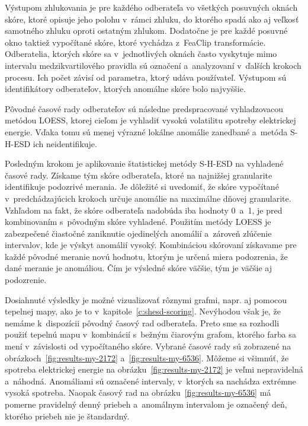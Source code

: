 \documentclass[a4paper,twoside,slovak,12pt,appendix]{article}
\begin{document}
Výstupom zhlukovania je pre každého odberateľa vo všetkých posuvných oknách
skóre, ktoré opisuje jeho polohu v~rámci zhluku, do ktorého spadá ako aj veľkosť
samotného zhluku oproti ostatným zhlukom. Dodatočne je pre každé posuvné okno
taktiež vypočítané skóre, ktoré vychádza z~FeaClip transformácie. Odberatelia,
ktorých skóre sa v~jednotlivých oknách často vyskytuje mimo intervalu
medzikvartilového pravidla sú označení a~analyzovaní v~ďalších krokoch procesu.
Ich počet závisí od parametra, ktorý udáva používateľ. Výstupom sú
identifikátory odberateľov, ktorých anomálne skóre bolo najvyššie.

Pôvodné časové rady odberateľov sú následne predspracované vyhladzovacou metódou
LOESS, ktorej cieľom je vyhladiť vysokú volatilitu spotreby elektrickej energie.
Vďaka tomu sú menej výrazné lokálne anomálie zanedbané a~metóda S-H-ESD ich
neidentifikuje.

Posledným krokom je aplikovanie štatistickej metódy S-H-ESD na vyhladené časové
rady. Získame tým skóre odberateľa, ktoré na najnižšej granularite identifikuje
podozrivé merania. Je dôležité si uvedomiť, že skóre vypočítané
v~predchádzajúcich krokoch určuje anomálie na maximálne dňovej granularite.
Vzhľadom na fakt, že skóre odberateľa nadobúda iba hodnoty 0~a~1, je pred
kombinovaním s~pôvodným skóre vyhladené. Použitím metódy LOESS je zabezpečené
čiastočné zaniknutie ojedinelých anomálií a~zároveň zlúčenie intervalov, kde je
výskyt anomálií vysoký. Kombináciou skórovaní získavame pre každé pôvodné
meranie novú hodnotu, ktorým je určená miera podozrenia, že dané meranie je
anomáliou. Čím je výsledné skóre väčšie, tým je väčšie aj podozrenie.

Dosiahnuté výsledky je možné vizualizovať rôznymi grafmi, napr. aj pomocou
tepelnej mapy, ako je to v~kapitole~\ref{c:shesd-scoring}. Nevýhodou však je, že
nemáme k~dispozícii pôvodný časový rad odberateľa. Preto sme sa rozhodli použiť
tepelnú mapu v~kombinácií s~bežným čiarovým grafom, ktorého farba sa mení
v~závislosti od vypočítaného skóre. Vybrané časové rady sú zobrazené na
obrázkoch~\ref{fig:results-my-2172} a~\ref{fig:results-my-6536}. Môžeme si
všimnúť, že spotreba elektrickej energie na obrázku~\ref{fig:results-my-2172}
je veľmi nepravidelná a~náhodná. Anomáliami sú označené intervaly, v~ktorých sa
nachádza extrémne vysoká spotreba. Naopak časový rad na
obrázku~\ref{fig:results-my-6536} má pomerne pravidelný denný priebeh
a~anomálnym intervalom je označený deň, ktorého priebeh nie je štandardný.
\end{document}
